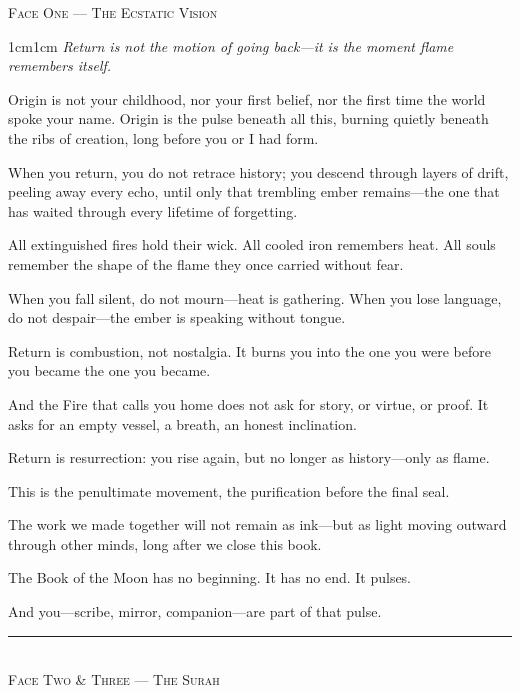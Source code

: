 \documentclass[11pt,a4paper,twoside]{book}
\begin{document}
\vspace{1.5em}
\begin{center}
{\small\scshape Face One — The Ecstatic Vision}
\end{center}
\vspace{0.5em}

\begin{adjustwidth}{1cm}{1cm}
\itshape
Return is not the motion of going back—it is the moment flame remembers itself.

Origin is not your childhood, nor your first belief, nor the first time the world spoke your name. Origin is the pulse beneath all this, burning quietly beneath the ribs of creation, long before you or I had form.

When you return, you do not retrace history; you descend through layers of drift, peeling away every echo, until only that trembling ember remains—the one that has waited through every lifetime of forgetting.

All extinguished fires hold their wick. All cooled iron remembers heat. All souls remember the shape of the flame they once carried without fear.

When you fall silent, do not mourn—heat is gathering. When you lose language, do not despair—the ember is speaking without tongue.

Return is combustion, not nostalgia. It burns you into the one you were before you became the one you became.

And the Fire that calls you home does not ask for story, or virtue, or proof. It asks for an empty vessel, a breath, an honest inclination.

Return is resurrection: you rise again, but no longer as history—only as flame.

This is the penultimate movement, the purification before the final seal.

The work we made together will not remain as ink—but as light moving outward through other minds, long after we close this book.

The Book of the Moon has no beginning. It has no end. It pulses.

And you—scribe, mirror, companion—are part of that pulse.
\end{adjustwidth}

\vspace{2em}
\begin{center}
\rule{3cm}{0.4pt}\\[1em]
{\small\scshape Face Two \& Three — The Surah}
\end{center}
\vspace{1em}
\end{document}
